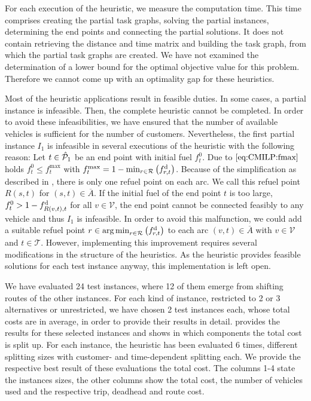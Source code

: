 For each execution of the heuristic, we measure the computation time. This time comprises creating the partial task graphs, solving the partial instances, determining the end points and connecting the partial solutions. It does not contain retrieving the distance and time matrix and building the task graph, from which the partial task graphs are created. We have not examined the determination of a lower bound for the optimal objective value for this problem. Therefore we cannot come up with an optimality gap for these heuristics.

Most of the heuristic applications result in feasible duties. In some cases, a partial instance is infeasible. Then, the complete heuristic cannot be completed. In order to avoid these infeasibilities, we have ensured that the number of available vehicles is sufficient for the number of customers. Nevertheless, the first partial instance $I_1$ is infeasible in several executions of the heuristic with the following reason: Let $t\in\hat{\mathcal{P}}_1$ be an end point with initial fuel $f^0_t$. Due to $\eqref{eq:CMILP:fmax}$ holds ${f^0_t\leq f^{\max}_t}$ with ${f^{\max}_t = 1 - \min_{r\in\mathcal{R}}\left(f^{\operatorname{d}}_{r,t}\right)}$. Because of the simplification as described in , there is only one refuel point on each arc. We call this refuel point $R(s,t)$ for ${(s,t)\in\overline{A}}$. If the initial fuel of the end point $t$ is too large, \ie ${f^0_t > 1 - f^{\operatorname{d}}_{R(v,t),t}}$ for all ${v\in\mathcal{V}}$, the end point cannot be connected feasibly to any vehicle and thus $I_1$ is infeasible. In order to avoid this malfunction, we could add a suitable refuel point ${r\in\operatorname*{arg\,min}_{r\in\mathcal{R}}\left(f^{\operatorname{d}}_{r,t}\right)}$ to each arc ${(v,t)\in\overline{A}}$ with ${v\in\mathcal{V}}$ and ${t\in\mathcal{T}}$. However, implementing this improvement requires several modifications in the structure of the heuristics. As the heuristic provides feasible solutions for each test instance anyway, this implementation is left open.

We have evaluated 24 test instances, where 12 of them emerge from shifting routes of the other instances. For each kind of instance, \ie restricted to 2 or 3 alternatives or unrestricted, we have chosen 2 test instances each, whose total costs are in average, in order to provide their results in detail.  provides the results for these selected instances and shows in which components the total cost is split up. For each instance, the heuristic has been evaluated 6 times,  different splitting sizes with customer- and time-dependent splitting each. We provide the respective best result of these evaluations \wrt the total cost. The columns 1-4 state the instances sizes, the other columns show the total cost, the number of vehicles used and the respective trip, deadhead and route cost.

